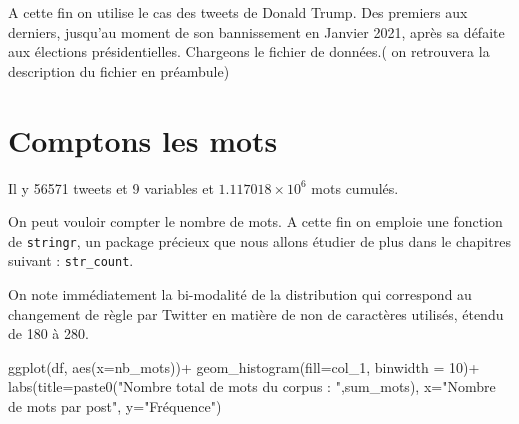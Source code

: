 \documentclass[
  letterpaper,
  DIV=11,
  numbers=noendperiod]{scrreprt}
\newenvironment{Shaded}{\begin{snugshade}}{\end{snugshade}}
\newcommand{\AttributeTok}[1]{\textcolor[rgb]{0.40,0.45,0.13}{#1}}
\newcommand{\CommentTok}[1]{\textcolor[rgb]{0.37,0.37,0.37}{#1}}
\newcommand{\DecValTok}[1]{\textcolor[rgb]{0.68,0.00,0.00}{#1}}
\newcommand{\FunctionTok}[1]{\textcolor[rgb]{0.28,0.35,0.67}{#1}}
\newcommand{\NormalTok}[1]{\textcolor[rgb]{0.00,0.23,0.31}{#1}}
\newcommand{\OtherTok}[1]{\textcolor[rgb]{0.00,0.23,0.31}{#1}}
\newcommand{\SpecialCharTok}[1]{\textcolor[rgb]{0.37,0.37,0.37}{#1}}
\newcommand{\StringTok}[1]{\textcolor[rgb]{0.13,0.47,0.30}{#1}}
\begin{document}
A cette fin on utilise le cas des tweets de Donald Trump. Des premiers
aux derniers, jusqu'au moment de son bannissement en Janvier 2021, après
sa défaite aux élections présidentielles. Chargeons le fichier de
données.( on retrouvera la description du fichier en préambule)

\begin{Shaded}
\end{Shaded}

\section{Comptons les mots}\label{comptons-les-mots}

Il y 56571 tweets et 9 variables et \ensuremath{1.117018\times 10^{6}}
mots cumulés.

On peut vouloir compter le nombre de mots. A cette fin on emploie une
fonction de \texttt{stringr}, un package précieux que nous allons
étudier de plus dans le chapitres suivant : \texttt{str\_count}.

On note immédiatement la bi-modalité de la distribution qui correspond
au changement de règle par Twitter en matière de non de caractères
utilisés, étendu de 180 à 280.

\begin{Shaded}
\begin{Highlighting}[]
\FunctionTok{ggplot}\NormalTok{(df, }\FunctionTok{aes}\NormalTok{(}\AttributeTok{x=}\NormalTok{nb\_mots))}\SpecialCharTok{+}
  \FunctionTok{geom\_histogram}\NormalTok{(}\AttributeTok{fill=}\NormalTok{col\_1, }\AttributeTok{binwidth =} \DecValTok{10}\NormalTok{)}\SpecialCharTok{+}
  \FunctionTok{labs}\NormalTok{(}\AttributeTok{title=}\FunctionTok{paste0}\NormalTok{(}\StringTok{"Nombre total de mots du corpus : "}\NormalTok{,sum\_mots), }
       \AttributeTok{x=}\StringTok{"Nombre de mots par post"}\NormalTok{, }
       \AttributeTok{y=}\StringTok{"Fréquence"}\NormalTok{)}
\end{Highlighting}
\end{Shaded}
\end{document}
